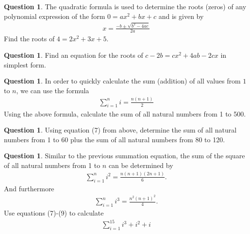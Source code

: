 \documentclass[12pt]{article}
\theoremstyle{definition}
\newtheorem{question}[thm]{Question}
\begin{document}
\vspace{5cm}

\begin{question}
The quadratic formula is used to determine the roots (zeros) of any polynomial expression of the form $0=ax^2+bx+c$ and is given by
\begin{align}
x=\frac{-b\pm\sqrt{b^2-4ac}}{2a}
\end{align}
	Find the roots of $4=2x^2+3x+5$.
\end{question}

\vspace{4cm}

\begin{question}
	Find an equation for the roots of $c-2b=cx^2+4ab-2cx$ in simplest form.
\end{question}

\vspace{4cm}

\begin{question}
In order to quickly calculate the sum (addition) of all values from $1$ to $n$, we can use the formula
\begin{align}
\sum_{i=1}^{n}i=\frac{n(n+1)}{2}
\end{align}
Using the above formula, calculate the sum of all natural numbers from 1 to 500.
\end{question}

\vspace{3cm}

\begin{question}
	Using equation (7) from above, determine the sum of all natural numbers from 1 to 60 plus the sum of all natural numbers from 80 to 120.
\end{question}

\vspace{3cm}

\begin{question}
Similar to the previous summation equation, the sum of the square of all natural numbers from 1 to $n$ can be determined by
\begin{align}
\sum_{i=1}^{n}i^2=\frac{n(n+1)(2n+1)}{6}.
\end{align}
And furthermore
\begin{align}
\sum_{i=1}^{n}i^3=\frac{n^2(n+1)^2}{4}.
\end{align}
	Use equations (7)-(9) to calculate 
	\begin{align}
	\sum_{i=1}^{15}i^3+i^2+i
	\end{align}
\end{question}
\end{document}
